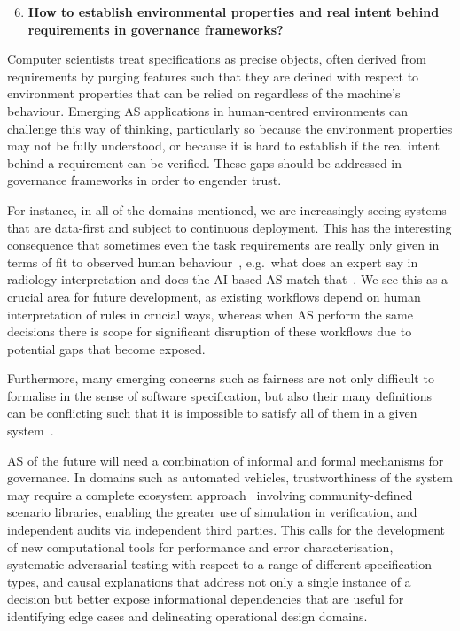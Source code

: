 \documentclass[sigconf,nonacm]{acmart}%
\begin{document}
	\begin{enumerate}[leftmargin=0.5cm]
		\setcounter{enumi}{5}
		\item \textbf{How to establish environmental properties and real intent behind requirements in governance frameworks?}
	\end{enumerate}
	Computer scientists treat specifications as precise objects, often derived from requirements by purging features such that they are defined with respect to environment properties that can be relied on regardless of the machine's behaviour. Emerging AS applications in human-centred environments can challenge this way of thinking, particularly so because the environment properties may not be fully understood, or because it is hard to establish if the real intent behind a requirement can be verified. These gaps should be addressed in governance frameworks in order to engender trust.
	
	For instance, in all of the domains mentioned, we are increasingly seeing systems that are data-first and subject to continuous deployment. This has the interesting consequence that sometimes even the task requirements are really only given in terms of fit to observed human behaviour~\cite{topol2019high}, e.g.\ what does an expert say in radiology interpretation and does the AI-based AS match that~\cite{Freemann1872}. We see this as a crucial area for future development, as existing workflows depend on human interpretation of rules in crucial ways, whereas when AS perform the same decisions there is scope for significant disruption of these workflows due to potential gaps that become exposed.

	Furthermore, many emerging concerns such as fairness are not only difficult to formalise in the sense of software specification, but also their many definitions can be conflicting such that it is impossible to satisfy all of them in a given system~\cite{narayanan21fairness}. 
	
	AS of the future will need a combination of informal and formal mechanisms for governance. In domains such as automated vehicles, trustworthiness of the system may require a complete ecosystem approach~\cite{koopman2019certification} involving community-defined scenario libraries, enabling the greater use of simulation in verification, and independent audits via independent third parties. This calls for the development of new computational tools for performance and error characterisation, systematic adversarial testing with respect to a range of different specification types, and causal explanations that address not only a single instance of a decision but better expose informational dependencies that are useful for identifying edge cases and delineating operational design domains. 
	
\end{document}
